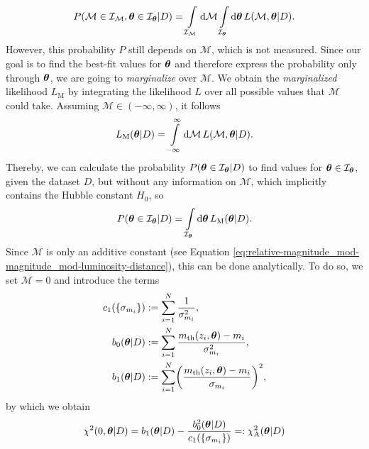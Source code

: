 \begin{align}
    P(\mathcal{M} \in \mathcal{I}_{\mathcal{M}}, \vb*{\theta} \in \mathcal{I}_{\vb*{\theta}} \vert D) = \int\limits_{\mathcal{I}_{\mathcal{M}}} \dd{\mathcal{M}} \int\limits_{\mathcal{I}_{\vb*\theta}} \dd{\vb*{\theta}} L(\mathcal{M}, \vb*{\theta} \vert D). \label{eq:probability}   
\end{align}
However, this probability $P$ still depends on $\mathcal{M}$, which is not measured. Since our goal is to find the best-fit values for $\vb*{\theta}$ and therefore express the probability only through $\vb*{\theta}$, we are going to \textit{marginalize} over $\mathcal{M}$. We obtain the \textit{marginalized} likelihood $L_{\text{M}}$ by integrating the likelihood $L$ over all possible values that $\mathcal{M}$ could take. Assuming $\mathcal{M} \in (-\infty, \infty)$, it follows  
\begin{align}
    L_{\text{M}}(\vb*{\theta} \vert D) = \int\limits_{-\infty}^{\infty} \dd{\mathcal{M}} L(\mathcal{M}, \vb*{\theta} \vert D). \label{eq:marginalized-likelihood} 
\end{align}
Thereby, we can calculate the probability $P(\vb*{\theta} \in \mathcal{I}_{\vb*{\theta}} \vert D)$ to find values for $\vb*{\theta} \in \mathcal{I}_{\vb*{\theta}}$, given the dataset $D$, but without any information on $\mathcal{M}$, which implicitly contains the Hubble constant $H_{0}$, so
\begin{align}
    P(\vb*{\theta} \in \mathcal{I}_{\vb*{\theta}} \vert D) = \int\limits_{\mathcal{I}_{\vb*{\theta}}} \dd{\vb*{\theta}} L_{\text{M}}(\vb*{\theta} \vert D). \label{eq:marginalized-probability}
\end{align}
Since $\mathcal{M}$ is only an additive constant (see Equation \eqref{eq:relative-magnitude_mod-magnitude_mod-luminosity-distance}), this can be done analytically. To do so, we set $\mathcal{M} = 0$ and introduce the terms
\begin{align}
    c_{1}(\{\sigma_{m_{i}} \}) &:= \sum_{i = 1}^{N} \frac{1}{\sigma_{m_{i}}^2}, \\
    b_{0}(\vb*{\theta} \vert D) &:= \sum_{i = 1}^{N} \frac{m_{\text{th}}(z_{i}, \vb*{\theta}) - m_{i}}{\sigma_{m_{i}}^2}, \\
    b_{1}(\vb*{\theta} \vert D) &:= \sum_{i = 1}^{N} \biggr(\frac{m_{\text{th}}(z_{i}, \vb*{\theta}) - m_{i}}{\sigma_{m_{i}}} \biggl)^2,
\end{align}
by which we obtain
\begin{align}
    \chi^2 (0, \vb*{\theta} \vert D) = b_{1}(\vb*{\theta} \vert D) - \frac{b_{0}^2 (\vb*{\theta} \vert D)}{c_{1}(\{ \sigma_{m_{i}} \})} =: \chi_{\text{A}}^2 (\vb*{\theta} \vert D) \label{eq:analytic-chi-square} 
\end{align}
